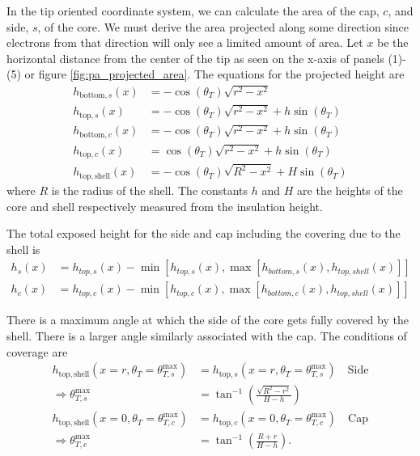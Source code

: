 In the tip oriented coordinate system, we can calculate the area of the cap, $c$, and side, $s$, of the core. We must derive the area projected along some direction since electrons from that direction will only see a limited amount of area. Let $x$ be the horizontal distance from the center of the tip as seen on the x-axis of panels (1)-(5) or figure \ref{fig:pa_projected_area}. The equations for the projected height are
\begin{align*}
    h_{\mathrm{bottom}, s}(x) &= -\cos(\theta_T) \sqrt{r^2 - x^2} \\
    h_{\mathrm{top}, s}(x) &= -\cos(\theta_T) \sqrt{r^2 - x^2} + h \sin(\theta_T) \\
    h_{\mathrm{bottom}, c}(x) &= -\cos(\theta_T) \sqrt{r^2 - x^2} + h \sin(\theta_T) \\
    h_{\mathrm{top}, c}(x) &= \cos(\theta_T) \sqrt{r^2 - x^2} + h \sin(\theta_T) \\
    h_{\mathrm{top}, \mathrm{shell}}(x) &= -\cos(\theta_T) \sqrt{R^2 - x^2} + H \sin(\theta_T)
\end{align*}
where $R$ is the radius of the shell. The constants $h$ and $H$ are the heights of the core and shell respectively measured from the insulation height.

The total exposed height for the side and cap including the covering due to the shell is
\begin{align*}
    h_s(x) &= h_{top,s}(x) - \min\left[h_{top,s}(x), \max\left[h_{bottom,s}(x), h_{top,shell}(x)\right]\right] \\
    h_c(x) &= h_{top,c}(x) - \min\left[h_{top,c}(x), \max\left[h_{bottom,c}(x), h_{top,shell}(x)\right]\right]
\end{align*}

There is a maximum angle at which the side of the core gets fully covered by the shell. There is a larger angle similarly associated with the cap. The conditions of coverage are
\begin{align*}
    h_{\mathrm{top}, \mathrm{shell}}(x = r, \theta_T = \theta_{T,s}^\mathrm{max}) &= h_{\mathrm{top}, s}(x = r, \theta_T = \theta_{T,s}^\mathrm{max}) \quad \mathrm{Side} \\
    \Rightarrow \theta_{T,s}^\mathrm{max} &= \tan^{-1} \left(\frac{\sqrt{R^2 - r^2}}{H - h}\right) \\
    h_{\mathrm{top}, \mathrm{shell}}(x = 0, \theta_T = \theta_{T,c}^\mathrm{max}) &= h_{\mathrm{top}, c}(x = 0, \theta_T = \theta_{T,c}^\mathrm{max}) \quad \mathrm{Cap} \\
    \Rightarrow \theta_{T,c}^\mathrm{max} &= \tan^{-1} \left(\frac{R + r}{H - h}\right).
\end{align*}

